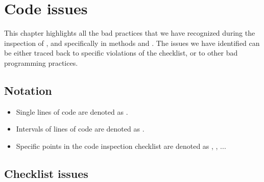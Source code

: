 \chapter{Code issues}
This chapter highlights all the bad practices that we have recognized during the inspection of , and specifically in methods  and . The issues we have identified can be either traced back to specific violations of the checklist, or to other bad programming practices. 

\section{Notation}
\begin{itemize}
    \item Single lines of code are denoted as .
    \item Intervals of lines of code are denoted as .
    \item Specific points in the code inspection checklist are denoted as , , ... 
\end{itemize}
\section{Checklist issues}

